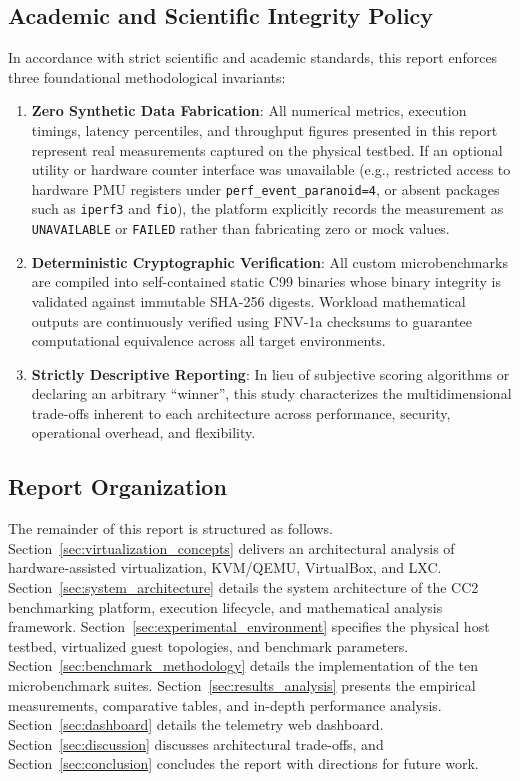 \subsection{Academic and Scientific Integrity Policy}
\label{subsec:integrity_policy}

In accordance with strict scientific and academic standards, this report enforces three foundational methodological invariants:
\begin{enumerate}
    \item \textbf{Zero Synthetic Data Fabrication}: All numerical metrics, execution timings, latency percentiles, and throughput figures presented in this report represent real measurements captured on the physical testbed. If an optional utility or hardware counter interface was unavailable (e.g., restricted access to hardware PMU registers under \texttt{perf\_}\allowbreak\texttt{event\_}\allowbreak\texttt{paranoid=4}, or absent packages such as \texttt{iperf3} and \texttt{fio}), the platform explicitly records the measurement as \texttt{UNAVAILABLE} or \texttt{FAILED} rather than fabricating zero or mock values.
    \item \textbf{Deterministic Cryptographic Verification}: All custom microbenchmarks are compiled into self-contained static C99 binaries whose binary integrity is validated against immutable SHA-256 digests. Workload mathematical outputs are continuously verified using FNV-1a checksums to guarantee computational equivalence across all target environments.
    \item \textbf{Strictly Descriptive Reporting}: In lieu of subjective scoring algorithms or declaring an arbitrary ``winner'', this study characterizes the multidimensional trade-offs inherent to each architecture across performance, security, operational overhead, and flexibility.
\end{enumerate}

\subsection{Report Organization}
\label{subsec:organization}

The remainder of this report is structured as follows. Section~\ref{sec:virtualization_concepts} delivers an architectural analysis of hardware-assisted virtualization, KVM/QEMU, VirtualBox, and LXC. Section~\ref{sec:system_architecture} details the system architecture of the CC2 benchmarking platform, execution lifecycle, and mathematical analysis framework. Section~\ref{sec:experimental_environment} specifies the physical host testbed, virtualized guest topologies, and benchmark parameters. Section~\ref{sec:benchmark_methodology} details the implementation of the ten microbenchmark suites. Section~\ref{sec:results_analysis} presents the empirical measurements, comparative tables, and in-depth performance analysis. Section~\ref{sec:dashboard} details the telemetry web dashboard. Section~\ref{sec:discussion} discusses architectural trade-offs, and Section~\ref{sec:conclusion} concludes the report with directions for future work.
